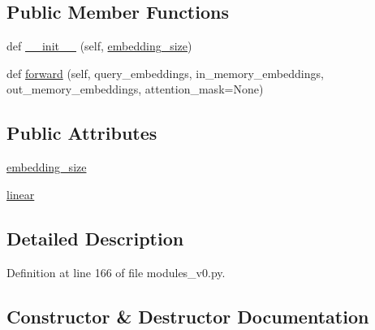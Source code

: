 \subsection*{Public Member Functions}
\begin{DoxyCompactItemize}
\item 
def \hyperlink{classparlai_1_1agents_1_1legacy__agents_1_1memnn_1_1modules__v0_1_1Hop_a76029bb0d257bc0a01f2a03b3480321a}{\+\_\+\+\_\+init\+\_\+\+\_\+} (self, \hyperlink{classparlai_1_1agents_1_1legacy__agents_1_1memnn_1_1modules__v0_1_1Hop_ac291a01e4b365714a352d411f353bdc6}{embedding\+\_\+size})
\item 
def \hyperlink{classparlai_1_1agents_1_1legacy__agents_1_1memnn_1_1modules__v0_1_1Hop_a19e28fabccb536fcc5f0db0e92a7a135}{forward} (self, query\+\_\+embeddings, in\+\_\+memory\+\_\+embeddings, out\+\_\+memory\+\_\+embeddings, attention\+\_\+mask=None)
\end{DoxyCompactItemize}
\subsection*{Public Attributes}
\begin{DoxyCompactItemize}
\item 
\hyperlink{classparlai_1_1agents_1_1legacy__agents_1_1memnn_1_1modules__v0_1_1Hop_ac291a01e4b365714a352d411f353bdc6}{embedding\+\_\+size}
\item 
\hyperlink{classparlai_1_1agents_1_1legacy__agents_1_1memnn_1_1modules__v0_1_1Hop_ac96056089c04bfc0ed7ad4a364655956}{linear}
\end{DoxyCompactItemize}


\subsection{Detailed Description}


Definition at line 166 of file modules\+\_\+v0.\+py.



\subsection{Constructor \& Destructor Documentation}
\mbox{\label{classparlai_1_1agents_1_1legacy__agents_1_1memnn_1_1modules__v0_1_1Hop_a76029bb0d257bc0a01f2a03b3480321a}} 
